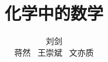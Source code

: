 \documentclass[12pt]{book}
\begin{document}
    \title{\heiti 化学中的数学}
    \author{\kaishu 刘剑 \\ \kaishu 蒋然 \ \kaishu 王崇斌 \ \kaishu 文亦质}
    \maketitle
    \tableofcontents

    \setlength\parskip{0.5 em}
    \mainmatter
 
    
    
    
    
    
    
    
    
    
    
\end{document}
